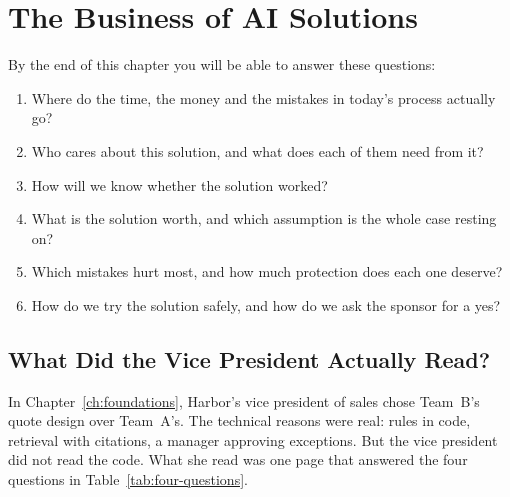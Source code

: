 
\chapter{The Business of AI Solutions}
\label{ch:business}

\begin{chapterquestions}
By the end of this chapter you will be able to answer these questions:
\begin{enumerate}[leftmargin=*,itemsep=2pt]
  \item Where do the time, the money and the mistakes in today's process actually go?
  \item Who cares about this solution, and what does each of them need from it?
  \item How will we know whether the solution worked?
  \item What is the solution worth, and which assumption is the whole case resting on?
  \item Which mistakes hurt most, and how much protection does each one deserve?
  \item How do we try the solution safely, and how do we ask the sponsor for a yes?
\end{enumerate}
\end{chapterquestions}

\section{What Did the Vice President Actually Read?}
\label{sec:business-question}

In Chapter~\ref{ch:foundations}, Harbor's vice president of sales chose Team~B's quote design over Team~A's. The technical reasons were real: rules in code, retrieval with citations, a manager approving exceptions. But the vice president did not read the code. What she read was one page that answered the four questions in Table~\ref{tab:four-questions}.

